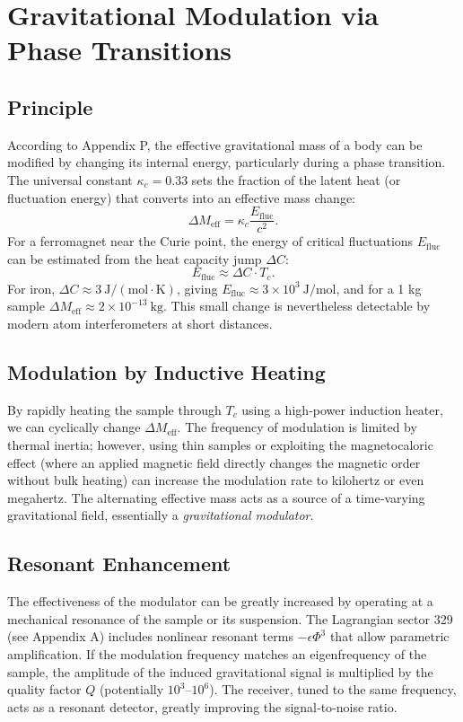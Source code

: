 \documentclass[12pt,a4paper]{article}
\newcommand{\kappac}{\kappa_c}
\begin{document}
	\section{Gravitational Modulation via Phase Transitions}
	\label{sec:modulation}
	
	\subsection{Principle}
	
	According to Appendix P, the effective gravitational mass of a body can be modified by changing its internal energy, particularly during a phase transition. The universal constant \(\kappac = 0.33\) sets the fraction of the latent heat (or fluctuation energy) that converts into an effective mass change:
	\[
	\Delta M_{\text{eff}} = \kappac \frac{E_{\text{fluc}}}{c^2}.
	\]
	For a ferromagnet near the Curie point, the energy of critical fluctuations \(E_{\text{fluc}}\) can be estimated from the heat capacity jump \(\Delta C\):
	\[
	E_{\text{fluc}} \approx \Delta C \cdot T_c.
	\]
	For iron, \(\Delta C \approx 3\ \mathrm{J/(mol\cdot K)}\), giving \(E_{\text{fluc}} \approx 3\times10^3\ \mathrm{J/mol}\), and for a 1 kg sample \(\Delta M_{\text{eff}} \approx 2\times10^{-13}\ \mathrm{kg}\). This small change is nevertheless detectable by modern atom interferometers at short distances.
	
	\subsection{Modulation by Inductive Heating}
	
	By rapidly heating the sample through \(T_c\) using a high‑power induction heater, we can cyclically change \(\Delta M_{\text{eff}}\). The frequency of modulation is limited by thermal inertia; however, using thin samples or exploiting the magnetocaloric effect (where an applied magnetic field directly changes the magnetic order without bulk heating) can increase the modulation rate to kilohertz or even megahertz. The alternating effective mass acts as a source of a time‑varying gravitational field, essentially a \emph{gravitational modulator}.
	
	\subsection{Resonant Enhancement}
	
	The effectiveness of the modulator can be greatly increased by operating at a mechanical resonance of the sample or its suspension. The Lagrangian sector 329 (see Appendix A) includes nonlinear resonant terms \(-\epsilon\Phi^3\) that allow parametric amplification. If the modulation frequency matches an eigenfrequency of the sample, the amplitude of the induced gravitational signal is multiplied by the quality factor \(Q\) (potentially \(10^3\)–\(10^6\)). The receiver, tuned to the same frequency, acts as a resonant detector, greatly improving the signal‑to‑noise ratio.
	
\end{document}
